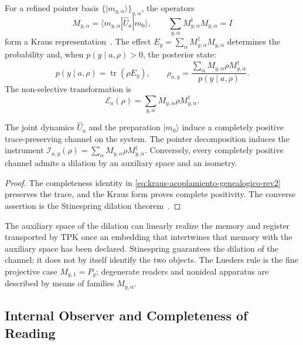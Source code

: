 For a refined pointer basis
\(\{|m_{y,\alpha}\rangle\}_{y,\alpha}\), the operators
\begin{equation}
 M_{y,\alpha}=\langle m_{y,\alpha}|\widehat U_a|m_0\rangle,
 \qquad
 \sum_{y,\alpha} M_{y,\alpha}^\dagger M_{y,\alpha}=I
 \label{eq:kraus-acoplamiento-genealogico-rev2}
\end{equation}
form a Kraus representation~\cite{Kraus1983}. The effect
\(E_y=\sum_\alpha M_{y,\alpha}^\dagger M_{y,\alpha}\) determines the
probability and, when \(p(y\mid a,\rho)>0\), the posterior state:
\begin{equation}
 p(y\mid a,\rho)=\operatorname{tr}(\rho E_y),
 \qquad
 \rho_{a,y}
 =\frac{\sum_\alpha M_{y,\alpha}\rho M_{y,\alpha}^\dagger}
 {p(y\mid a,\rho)}.
 \label{eq:instrumento-kraus-genealogico-rev2}
\end{equation}
The non-selective transformation is
\[
 \mathcal E_a(\rho)=
 \sum_{y,\alpha}M_{y,\alpha}\rho M_{y,\alpha}^\dagger.
\]

\begin{proposition}
\label{prop:acoplamiento-canal-reducido-rev2}
The joint dynamics \(\widehat U_a\) and the preparation \(|m_0\rangle\)
induce a completely positive trace-preserving channel on the
system. The pointer decomposition induces the instrument
\(\mathcal I_{a,y}(\rho)=
\sum_\alpha M_{y,\alpha}\rho M_{y,\alpha}^\dagger\). Conversely, every completely positive channel
admits a dilation by an auxiliary space and an
isometry.
\end{proposition}

\begin{proof}
The completeness identity in
\eqref{eq:kraus-acoplamiento-genealogico-rev2} preserves the trace, and the Kraus
form proves complete positivity. The converse assertion is the
Stinespring dilation theorem~\cite{Stinespring1955}.
\end{proof}

The auxiliary space of the dilation can linearly realize the memory and
register transported by TPK once an embedding that intertwines
that memory with the auxiliary space has been declared. Stinespring guarantees the dilation of the
channel; it does not by itself identify the two objects. The Lueders rule is the fine
projective case \(M_{y,1}=P_y\); degenerate readers and nonideal
apparatus are described by means of families \(M_{y,\alpha}\).

\subsection{Internal Observer and Completeness of Reading}

